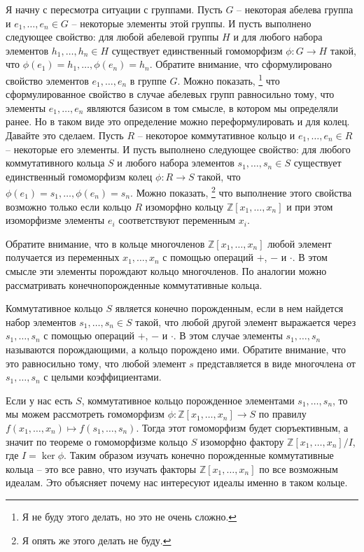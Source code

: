 Я начну с пересмотра ситуации с группами.
Пусть $G$ -- некоторая абелева группа и $e_1,\ldots, e_n\in G$ -- некоторые элементы этой группы.
И пусть выполнено следующее свойство: для любой абелевой группы $H$ и для любого набора элементов $h_1,\ldots, h_n\in H$ существует единственный гомоморфизм $\phi\colon G\to H$ такой, что $\phi(e_1) = h_1,\ldots,\phi(e_n) = h_n$.
Обратите внимание, что сформулировано свойство элементов $e_1,\ldots,e_n$ в группе $G$.
Можно показать,%
\footnote{Я не буду этого делать, но это не очень сложно.}
что сформулированное свойство в случае абелевых групп равносильно тому, что элементы $e_1,\ldots,e_n$ являются базисом в том смысле, в котором мы определяли ранее.
Но в таком виде это определение можно переформулировать и для колец.
Давайте это сделаем.
Пусть $R$ -- некоторое коммутативное кольцо и $e_1,\ldots,e_n\in R$ -- некоторые его элементы.
И пусть выполнено следующее свойство: для любого коммутативного кольца $S$ и любого набора элементов $s_1,\ldots,s_n\in S$ существует единственный гомоморфизм колец $\phi\colon R\to S$ такой, что $\phi(e_1) = s_1,\ldots,\phi(e_n) = s_n$.
Можно показать,%
\footnote{Я опять же этого делать не буду.}
что выполнение этого свойства возможно только если кольцо $R$ изоморфно кольцу $\mathbb Z[x_1,\ldots,x_n]$ и при этом изоморфизме элементы $e_i$ соответствуют переменным $x_i$.

Обратите внимание, что в кольце многочленов $\mathbb Z[x_1,\ldots,x_n]$ любой элемент получается из переменных $x_1,\ldots, x_n$ с помощью операций $+$, $-$ и $\cdot$.
В этом смысле эти элементы порождают кольцо многочленов.
По аналогии можно рассматривать конечнопорожденные коммутативные кольца.

\begin{definition}
\label{def::FinGenCommRing}
Коммутативное кольцо $S$ является конечно порожденным, если в нем найдется набор элементов $s_1,\ldots, s_n\in S$ такой, что любой другой элемент выражается через $s_1,\ldots,s_n$ с помощью операций $+$, $-$ и $\cdot$.
В этом случае элементы $s_1,\ldots, s_n$ называются порождающими, а кольцо порождено ими.
Обратите внимание, что это равносильно тому, что любой элемент $s$ представляется в виде многочлена от $s_1,\ldots,s_n$ с целыми коэффициентами.
\end{definition}

Если у нас есть $S$, коммутативное кольцо порожденное элементами $s_1,\ldots, s_n$, то мы можем рассмотреть гомоморфизм $\phi\colon \mathbb Z[x_1,\ldots,x_n]\to S$ по правилу $f(x_1,\ldots,x_n) \mapsto f(s_1,\ldots,s_n)$.
Тогда этот гомоморфизм будет сюръективным, а значит по теореме о гомоморфизме кольцо $S$ изоморфно фактору $\mathbb Z[x_1,\ldots, x_n] / I$, где $I = \ker \phi$.
Таким образом изучать конечно порожденные коммутативные кольца -- это все равно, что изучать факторы $\mathbb Z[x_1,\ldots, x_n]$ по все возможным идеалам.
Это объясняет почему нас интересуют идеалы именно в таком кольце.


